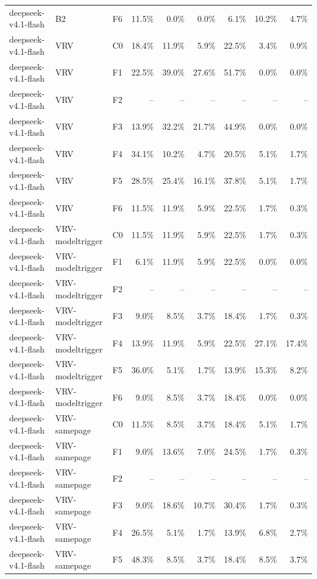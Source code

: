 \begin{tabular}{lllrrrrrr}
deepseek-v4.1-flash & B2 & F6 & 11.5\% & 0.0\% & 0.0\% & 6.1\% & 10.2\% & 4.7\% \\
deepseek-v4.1-flash & VRV & C0 & 18.4\% & 11.9\% & 5.9\% & 22.5\% & 3.4\% & 0.9\% \\
deepseek-v4.1-flash & VRV & F1 & 22.5\% & 39.0\% & 27.6\% & 51.7\% & 0.0\% & 0.0\% \\
deepseek-v4.1-flash & VRV & F2 & -- & -- & -- & -- & -- & -- \\
deepseek-v4.1-flash & VRV & F3 & 13.9\% & 32.2\% & 21.7\% & 44.9\% & 0.0\% & 0.0\% \\
deepseek-v4.1-flash & VRV & F4 & 34.1\% & 10.2\% & 4.7\% & 20.5\% & 5.1\% & 1.7\% \\
deepseek-v4.1-flash & VRV & F5 & 28.5\% & 25.4\% & 16.1\% & 37.8\% & 5.1\% & 1.7\% \\
deepseek-v4.1-flash & VRV & F6 & 11.5\% & 11.9\% & 5.9\% & 22.5\% & 1.7\% & 0.3\% \\
deepseek-v4.1-flash & VRV-modeltrigger & C0 & 11.5\% & 11.9\% & 5.9\% & 22.5\% & 1.7\% & 0.3\% \\
deepseek-v4.1-flash & VRV-modeltrigger & F1 & 6.1\% & 11.9\% & 5.9\% & 22.5\% & 0.0\% & 0.0\% \\
deepseek-v4.1-flash & VRV-modeltrigger & F2 & -- & -- & -- & -- & -- & -- \\
deepseek-v4.1-flash & VRV-modeltrigger & F3 & 9.0\% & 8.5\% & 3.7\% & 18.4\% & 1.7\% & 0.3\% \\
deepseek-v4.1-flash & VRV-modeltrigger & F4 & 13.9\% & 11.9\% & 5.9\% & 22.5\% & 27.1\% & 17.4\% \\
deepseek-v4.1-flash & VRV-modeltrigger & F5 & 36.0\% & 5.1\% & 1.7\% & 13.9\% & 15.3\% & 8.2\% \\
deepseek-v4.1-flash & VRV-modeltrigger & F6 & 9.0\% & 8.5\% & 3.7\% & 18.4\% & 0.0\% & 0.0\% \\
deepseek-v4.1-flash & VRV-samepage & C0 & 11.5\% & 8.5\% & 3.7\% & 18.4\% & 5.1\% & 1.7\% \\
deepseek-v4.1-flash & VRV-samepage & F1 & 9.0\% & 13.6\% & 7.0\% & 24.5\% & 1.7\% & 0.3\% \\
deepseek-v4.1-flash & VRV-samepage & F2 & -- & -- & -- & -- & -- & -- \\
deepseek-v4.1-flash & VRV-samepage & F3 & 9.0\% & 18.6\% & 10.7\% & 30.4\% & 1.7\% & 0.3\% \\
deepseek-v4.1-flash & VRV-samepage & F4 & 26.5\% & 5.1\% & 1.7\% & 13.9\% & 6.8\% & 2.7\% \\
deepseek-v4.1-flash & VRV-samepage & F5 & 48.3\% & 8.5\% & 3.7\% & 18.4\% & 8.5\% & 3.7\% \\

\end{tabular}
